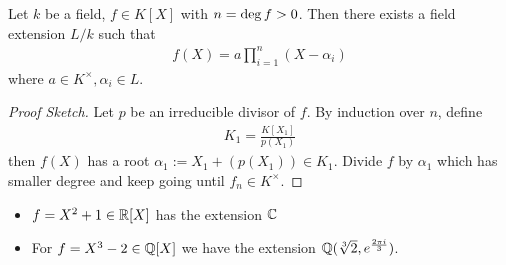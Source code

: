\begin{thm}[Kronecker]
  Let $k$ be a field, $f \in K[X]$ with $n = \operatorname{deg} f > 0$. 
  Then there exists a field extension $L/k$ such that
  \begin{align*}
    f(X) = a \prod_{i=1}^{n}(X - \alpha_i)
  \end{align*}
  where $a \in K^{\times}, \alpha_i \in L$.
\end{thm}
\begin{proof}[Proof Sketch]
  Let $p$ be an irreducible divisor of $f$.
  By induction over $n$, define
  \begin{align*}
    K_1 = \frac{K[X_1]}{p(X_1)}
  \end{align*}
  then $f(X)$ has a root $\alpha_1 := X_1 + (p(X_1)) \in K_1$.
  Divide $f$ by $\alpha_1$ which has smaller degree and keep going until $f_n \in K^{\times}$.
\end{proof}


\begin{itemize}
  \item $f = X^{2} + 1 \in \mathbb{R}[X]$ has the extension  $\mathbb{C}$
  \item For $f = X^{3} - 2 \in \mathbb{Q}[X]$ we have the extension $\mathbb{Q}(\sqrt[3]{2},e^{\frac{2 \pi i }{3}})$.
\end{itemize}
